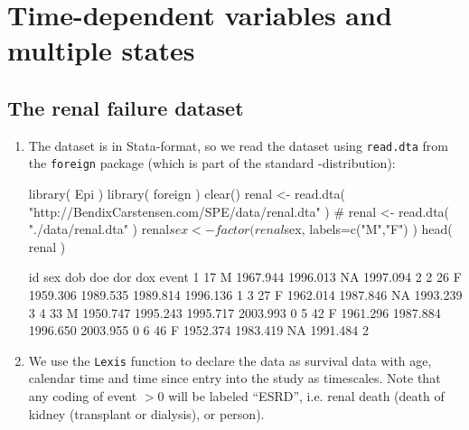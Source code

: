 

\renewcommand{\rwpre}{./graph/renal}
\section{Time-dependent variables and multiple states}




\subsection{The renal failure dataset}

\begin{enumerate}

    
\item The dataset is in Stata-format, so we read the dataset
  using \texttt{read.dta} from the \texttt{foreign} package (which is
  part of the standard \R-distribution):
\begin{Schunk}
\begin{Sinput}
 library( Epi ) 
 library( foreign )
 clear()
 renal <- read.dta( "http://BendixCarstensen.com/SPE/data/renal.dta" )
 # renal <- read.dta( "./data/renal.dta" )
 renal$sex <- factor( renal$sex, labels=c("M","F") )
 head( renal )
\end{Sinput}
\begin{Soutput}
  id sex      dob      doe      dor      dox event
1 17   M 1967.944 1996.013       NA 1997.094     2
2 26   F 1959.306 1989.535 1989.814 1996.136     1
3 27   F 1962.014 1987.846       NA 1993.239     3
4 33   M 1950.747 1995.243 1995.717 2003.993     0
5 42   F 1961.296 1987.884 1996.650 2003.955     0
6 46   F 1952.374 1983.419       NA 1991.484     2
\end{Soutput}
\end{Schunk}


\item We use the \texttt{Lexis} function to declare the data as
  survival data with age, calendar time and time since entry into the
  study as timescales. Note that any coding of event $>0$ will be
  labeled ``ESRD'', i.e. renal death (death of kidney (transplant or
  dialysis), or person).
  

\end{enumerate}
